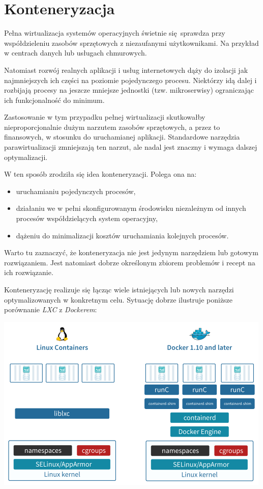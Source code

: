 \documentclass[a4paper,12pt,twoside,openany]{report}
\providecommand{\tightlist}{%
  \setlength{\itemsep}{0pt}\setlength{\parskip}{0pt}}
\begin{document}
\pagebreak

\hypertarget{konteneryzacja}{%
\section{Konteneryzacja}\label{konteneryzacja}}

Pełna wirtualizacja systemów operacyjnych świetnie się~sprawdza przy
współdzieleniu zasobów sprzętowych z niezaufanymi użytkownikami. Na
przykład w centrach danych lub usługach chmurowych.

Natomiast rozwój realnych aplikacji i usług internetowych dąży do
izolacji jak najmniejszych ich części na poziomie pojedynczego procesu.
Niektórzy idą dalej i rozbijają procesy na jeszcze mniejsze jednostki
(tzw. mikroserwisy) ograniczając ich funkcjonalność do minimum.

Zastosowanie w tym przypadku pełnej wirtualizacji skutkowałby
nieproporcjonalnie dużym narzutem zasobów sprzętowych, a przez to
finansowych, w stosunku do uruchamianej aplikacji. Standardowe narzędzia
parawirtualizacji zmniejszają ten narzut, ale nadal jest znaczny i
wymaga dalszej optymalizacji.

W ten sposób zrodziła się idea konteneryzacji. Polega ona na:

\begin{itemize}
\tightlist
\item
  uruchamianiu pojedynczych procesów,
\item
  działaniu we w pełni skonfigurowanym środowisku niezależnym od innych
  procesów współdzielących system operacyjny,
\item
  dążeniu do minimalizacji kosztów uruchamiania kolejnych procesów.
\end{itemize}

Warto tu zaznaczyć, że konteneryzacja nie jest jedynym narzędziem lub
gotowym rozwiązaniem. Jest natomiast dobrze określonym zbiorem problemów
i recept na ich rozwiązanie.

\pagebreak

Konteneryzację realizuje się łącząc wiele istniejących lub nowych
narzędzi optymalizowanych w konkretnym celu. Sytuację dobrze ilustruje
poniższe porównanie \emph{LXC} z \emph{Dockerem}:

\includegraphics[width=5.20833in,height=3.33333in]{assets/lxc-vs-docker.png}\\
\end{document}
